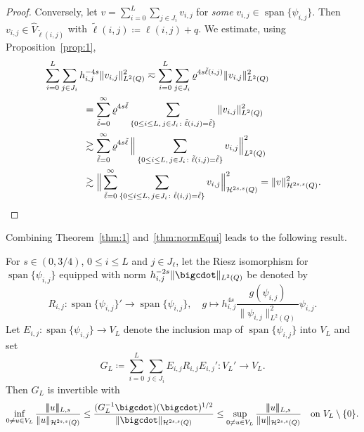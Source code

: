 \documentclass{amsart}
\DeclareMathOperator{\Span}{span}
\newcommand{\nrm}{| \! | \! |}
\newcommand{\cH}{\mathcal H}
\begin{document}
\begin{proof}
Conversely, let $v=\sum_{i=0}^L\sum_{j \in J_i} v_{i,j}$ for \emph{some} $v_{i,j}\in \Span\{\psi_{i,j}\}$.
Then $v_{i,j} \in \widehat{V}_{\tilde{\ell}(i,j)}$ with $\tilde{\ell}(i,j) \coloneqq \ell(i,j)+q$. We estimate, using  Proposition~\ref{prop:1},
\begin{align*}
&\sum_{i=0}^L \sum_{j \in J_i} h_{i,j}^{-4s}\|v_{i,j}\|^2_{L^2(Q)}  \eqsim
\sum_{i=0}^L \sum_{j \in J_i} \varrho^{4s\tilde{\ell}(i,j)}\|v_{i,j}\|^2_{L^2(Q)}\\
 &\qquad\qquad= \sum_{\tilde{\ell}=0}^\infty \varrho^{4s\tilde{\ell}} \sum_{\{0 \leq i \leq L,\,j \in J_i\colon\tilde{\ell}(i,j)=\tilde{\ell}\}}\|v_{i,j}\|^2_{L^2(Q)} \\
 &\qquad\qquad\gtrsim \sum_{\tilde{\ell}=0}^\infty \varrho^{4s\tilde{\ell}}\, \Big\|\sum_{\{0 \leq i \leq L,\,j \in J_i\colon\tilde{\ell}(i,j)=\tilde{\ell}\}}v_{i,j}\Big\|^2_{L^2(Q)} \\
 &\qquad\qquad \gtrsim \Big\|\sum_{\tilde{\ell}=0}^\infty \sum_{\{0 \leq i \leq L,\,j \in J_i\colon\tilde{\ell}(i,j)=\tilde{\ell}\}} v_{i,j}\Big\|_{\cH^{2s,s}(Q)}^2=
\|v\|_{\cH^{2s,s}(Q)}^2.\qedhere
\end{align*}
\end{proof}

Combining Theorem~\ref{thm:1} and~\ref{thm:normEqui} leads to the following result.

\begin{corollary}[Preconditioner] 
For $s \in (0,3/4)$, $0 \leq i \leq L$ and $j \in J_\ell$, let the Riesz isomorphism for $\Span \{\psi_{i,j}\}$ equipped with norm $h_{i,j}^{-2s}\|\bigcdot\|_{L^2(Q)}$ be denoted by
\begin{equation*}
R_{i,j}\colon \Span\{\psi_{i,j}\}' \rightarrow \Span \{\psi_{i,j}\},\quad g \mapsto h_{i,j}^{4s} \frac{g(\psi_{i,j})}{\|\psi_{i,j}\|_{L^2(Q)}^2} \psi_{i,j}.
\end{equation*}
Let $E_{i,j}\colon \Span \{\psi_{i,j}\}\to V_L$ denote the inclusion map of $\Span \{\psi_{i,j}\}$ into $V_L$ and set 
\begin{equation*}
G_L \coloneqq \sum_{i=0}^L \sum_{j \in J_i} E_{i,j} R_{i,j} E_{i,j}'\colon V_L' \rightarrow V_L.
\end{equation*}
Then $G_L$ is invertible with
\begin{equation*}
\inf_{0 \neq u \in V_L} \frac{\nrm u\nrm_{L,s}}{\|u\|_{\cH^{2s,s}(Q)}} \leq \frac{(G_L^{-1}\bigcdot)(\bigcdot)^{1/2}}{\|\bigcdot\|_{\cH^{2s,s}(Q)}} 
\leq \sup_{0 \neq u \in V_L} \frac{\nrm u\nrm_{L,s}}{\|u\|_{\cH^{2s,s}(Q)}} 
\quad\text{on } V_L \setminus \{0\}.
\end{equation*}
\end{corollary}
\end{document}
